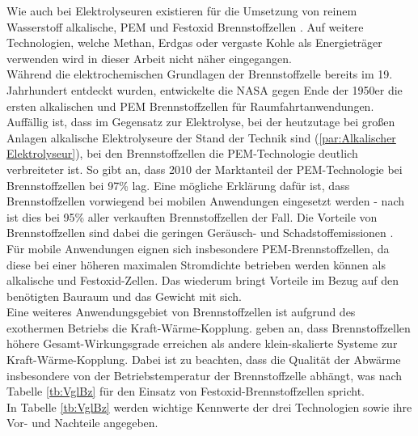 Wie auch bei Elektrolyseuren existieren für die Umsetzung von reinem Wasserstoff alkalische, PEM und Festoxid Brennstoffzellen \citep{lucia_overview_2014}. Auf weitere Technologien, welche Methan, Erdgas oder vergaste Kohle als Energieträger verwenden wird in dieser Arbeit nicht näher eingegangen.\\
Während die elektrochemischen Grundlagen der Brennstoffzelle bereits im 19. Jahrhundert entdeckt wurden, entwickelte die NASA   gegen Ende der 1950er die ersten alkalischen und PEM Brennstoffzellen für Raumfahrtanwendungen. Auffällig ist, dass im Gegensatz zur Elektrolyse, bei der heutzutage bei großen Anlagen alkalische Elektrolyseure der Stand der Technik sind (\ref{par:Alkalischer Elektrolyseur}), bei den Brennstoffzellen die PEM-Technologie deutlich verbreiteter ist. So gibt \citet{lucia_overview_2014} an, dass 2010  der Marktanteil der PEM-Technologie bei Brennstoffzellen bei 97\% lag. Eine mögliche Erklärung dafür ist, dass Brennstoffzellen vorwiegend bei mobilen Anwendungen eingesetzt werden - nach \citet{lucia_overview_2014} ist dies bei 95\% aller verkauften Brennstoffzellen der Fall. Die Vorteile von Brennstoffzellen sind dabei die geringen Geräusch- und Schadstoffemissionen \citep{olabi_prospects_2020}. Für mobile Anwendungen eignen sich insbesondere PEM-Brennstoffzellen, da diese bei einer höheren maximalen Stromdichte betrieben werden können als alkalische und Festoxid-Zellen. Das wiederum bringt  Vorteile im Bezug auf den benötigten Bauraum und das Gewicht mit sich.\\ 
Eine weiteres Anwendungsgebiet von Brennstoffzellen ist aufgrund des exothermen Betriebs die Kraft-Wärme-Kopplung. \citet{olabi_prospects_2020} geben an, dass Brennstoffzellen höhere Gesamt-Wirkungsgrade erreichen als andere klein-skalierte Systeme zur Kraft-Wärme-Kopplung. Dabei ist zu beachten, dass die Qualität der Abwärme insbesondere von der Betriebstemperatur der Brennstoffzelle abhängt, was nach Tabelle \ref{tb:VglBz} für den Einsatz von Festoxid-Brennstoffzellen spricht.\\ 
In Tabelle \ref{tb:VglBz} werden wichtige Kennwerte der drei Technologien sowie ihre Vor- und Nachteile angegeben.\\

